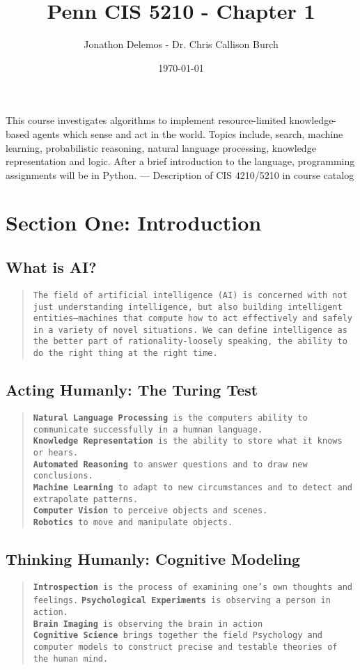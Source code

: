 \documentclass{article}
\title{Penn CIS 5210 - Chapter 1}
\author{Jonathon Delemos - Dr. Chris Callison Burch}
\date{\today}
\begin{document}
\maketitle

This course investigates algorithms to implement resource-limited knowledge-based agents which
sense and act in the world. Topics include, search, machine learning, probabilistic reasoning, natural
language processing, knowledge representation and logic. After a brief introduction to the language,
programming assignments will be in Python.
— Description of CIS 4210/5210 in course catalog

\section{Section One: Introduction}
\subsection{What is AI?}
\begin{quote}
    \texttt{The field of artificial intelligence (AI) is concerned with not just understanding intelligence, but also building intelligent entities—machines that compute how to act effectively and safely in a variety of novel situations.
        We can define intelligence as the better part of rationality-loosely speaking, the ability to do the right thing at the right time.}
\end{quote}
\subsection{Acting Humanly: The Turing Test}
\begin{quote}
    \texttt{\textbf{Natural Language Processing} is the computers ability to communicate successfully in a humnan language.\\ \textbf{Knowledge Representation}
        is the ability to store what it knows or hears. \\ \textbf{Automated Reasoning} to answer questions and to draw new conclusions. \\ \textbf{Machine Learning} to adapt to new circumstances and to detect and extrapolate patterns. \\}
    \texttt{\textbf{Computer Vision} to perceive objects and scenes. \\ \textbf{Robotics} to move and manipulate objects. \\}
\end{quote}
\subsection{Thinking Humanly: Cognitive Modeling}
\begin{quote}
    \texttt{\textbf{Introspection} is the process of examining one's own thoughts and feelings.}
    \texttt{\textbf{Psychological Experiments} is observing a person in action. \\ \textbf{Brain Imaging} is observing the brain in action
        \\ \textbf{Cognitive Science} brings together the field Psychology and computer models to construct precise and testable theories of the human mind.
    }
\end{quote}
\end{document}
